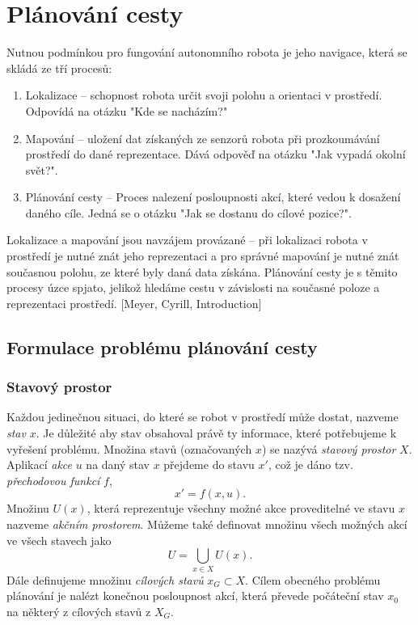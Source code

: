 
\chapter{Plánování cesty}
Nutnou podmínkou pro fungování autonomního robota je jeho navigace, která se skládá ze tří procesů:
\begin{enumerate}
	\item Lokalizace -- schopnost robota určit svoji polohu a orientaci v prostředí. Odpovídá na otázku "Kde se nacházím?"
	\item Mapování -- uložení dat získaných ze senzorů robota při prozkoumávání prostředí do dané reprezentace. Dává odpověď na otázku "Jak vypadá okolní svět?".
	\item Plánování cesty -- Proces nalezení posloupnosti akcí, které vedou k dosažení daného cíle. Jedná se o otázku "Jak se dostanu do cílové pozice?".
\end{enumerate}
Lokalizace a mapování jsou navzájem provázané -- při lokalizaci robota v prostředí je nutné znát jeho reprezentaci a pro správné mapování je nutné znát současnou polohu, ze které byly daná data získána. Plánování cesty je s těmito procesy úzce spjato, jelikož hledáme cestu v závislosti na současné poloze a reprezentaci prostředí. [Meyer, Cyrill, Introduction]

\section{Formulace problému plánování cesty}
\subsection{Stavový prostor}
Každou jedinečnou situaci, do které se robot v prostředí může dostat, nazveme \emph{stav} $x$. Je důležité aby stav obsahoval právě ty informace, které potřebujeme k vyřešení problému. Množina stavů (označovaných $x$) se nazývá \emph{stavový prostor} $X$. Aplikací \emph{akce} $u$ na daný stav $x$ přejdeme do stavu $x'$, což je dáno tzv. \emph{přechodovou funkcí} $f$,
\begin{equation}
x'=f\left(x,u\right).
\end{equation}
Množinu $U(x)$, která reprezentuje všechny možné akce proveditelné ve stavu $x$ nazveme \emph{akčním prostorem}. Můžeme také definovat množinu všech možných akcí ve všech stavech jako
\begin{equation}
U=\bigcup_{x \in X} U(x).
\end{equation}
Dále definujeme množinu \emph{cílových stavů} $x_G \subset X$. Cílem obecného problému plánování je nalézt konečnou posloupnost akcí, která převede počáteční stav $x_0$ na některý z cílových stavů z $X_G$. 

